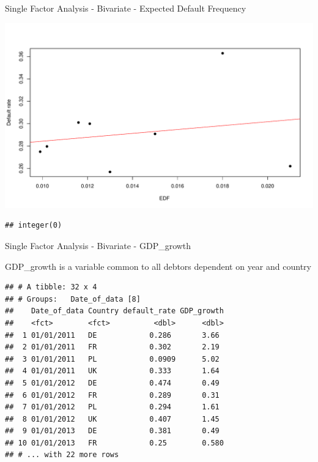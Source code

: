\documentclass[9pt,ignorenonframetext,]{beamer}
\newenvironment{Shaded}{\begin{snugshade}}{\end{snugshade}}
\newcommand{\KeywordTok}[1]{\textcolor[rgb]{0.13,0.29,0.53}{\textbf{#1}}}
\newcommand{\DataTypeTok}[1]{\textcolor[rgb]{0.13,0.29,0.53}{#1}}
\newcommand{\DecValTok}[1]{\textcolor[rgb]{0.00,0.00,0.81}{#1}}
\newcommand{\StringTok}[1]{\textcolor[rgb]{0.31,0.60,0.02}{#1}}
\newcommand{\OtherTok}[1]{\textcolor[rgb]{0.56,0.35,0.01}{#1}}
\newcommand{\OperatorTok}[1]{\textcolor[rgb]{0.81,0.36,0.00}{\textbf{#1}}}
\newcommand{\NormalTok}[1]{#1}
\begin{document}
\begin{frame}[fragile]{Single Factor Analysis - Bivariate - Expected
Default Frequency}

\includegraphics{Risk-Models-Development-Process_files/figure-beamer/unnamed-chunk-38-1.pdf}

\begin{verbatim}
## integer(0)
\end{verbatim}

\end{frame}

\begin{frame}[fragile]{Single Factor Analysis - Bivariate - GDP\_growth}

GDP\_growth is a variable common to all debtors dependent on year and
country

\begin{Shaded}
\end{Shaded}

\begin{verbatim}
## # A tibble: 32 x 4
## # Groups:   Date_of_data [8]
##    Date_of_data Country default_rate GDP_growth
##    <fct>        <fct>          <dbl>      <dbl>
##  1 01/01/2011   DE            0.286       3.66 
##  2 01/01/2011   FR            0.302       2.19 
##  3 01/01/2011   PL            0.0909      5.02 
##  4 01/01/2011   UK            0.333       1.64 
##  5 01/01/2012   DE            0.474       0.49 
##  6 01/01/2012   FR            0.289       0.31 
##  7 01/01/2012   PL            0.294       1.61 
##  8 01/01/2012   UK            0.407       1.45 
##  9 01/01/2013   DE            0.381       0.49 
## 10 01/01/2013   FR            0.25        0.580
## # ... with 22 more rows
\end{verbatim}

\end{frame}
\end{document}
